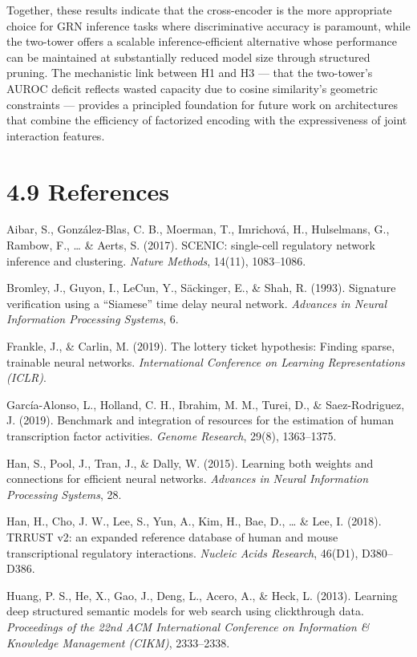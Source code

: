 \documentclass[
  12pt,
]{report}
\begin{document}
Together, these results indicate that the cross-encoder is the more
appropriate choice for GRN inference tasks where discriminative accuracy
is paramount, while the two-tower offers a scalable inference-efficient
alternative whose performance can be maintained at substantially reduced
model size through structured pruning. The mechanistic link between H1
and H3 --- that the two-tower's AUROC deficit reflects wasted capacity
due to cosine similarity's geometric constraints --- provides a
principled foundation for future work on architectures that combine the
efficiency of factorized encoding with the expressiveness of joint
interaction features.

\section{4.9 References}\label{references}

Aibar, S., González-Blas, C. B., Moerman, T., Imrichová, H., Hulselmans,
G., Rambow, F., \ldots{} \& Aerts, S. (2017). SCENIC: single-cell
regulatory network inference and clustering. \emph{Nature Methods},
14(11), 1083--1086.

Bromley, J., Guyon, I., LeCun, Y., Säckinger, E., \& Shah, R. (1993).
Signature verification using a ``Siamese'' time delay neural network.
\emph{Advances in Neural Information Processing Systems}, 6.

Frankle, J., \& Carlin, M. (2019). The lottery ticket hypothesis:
Finding sparse, trainable neural networks. \emph{International
Conference on Learning Representations (ICLR)}.

García-Alonso, L., Holland, C. H., Ibrahim, M. M., Turei, D., \&
Saez-Rodriguez, J. (2019). Benchmark and integration of resources for
the estimation of human transcription factor activities. \emph{Genome
Research}, 29(8), 1363--1375.

Han, S., Pool, J., Tran, J., \& Dally, W. (2015). Learning both weights
and connections for efficient neural networks. \emph{Advances in Neural
Information Processing Systems}, 28.

Han, H., Cho, J. W., Lee, S., Yun, A., Kim, H., Bae, D., \ldots{} \&
Lee, I. (2018). TRRUST v2: an expanded reference database of human and
mouse transcriptional regulatory interactions. \emph{Nucleic Acids
Research}, 46(D1), D380--D386.

Huang, P. S., He, X., Gao, J., Deng, L., Acero, A., \& Heck, L. (2013).
Learning deep structured semantic models for web search using
clickthrough data. \emph{Proceedings of the 22nd ACM International
Conference on Information \& Knowledge Management (CIKM)}, 2333--2338.
\end{document}
